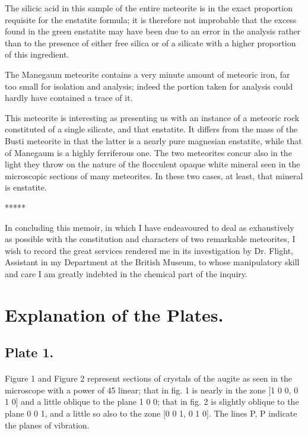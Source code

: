 \documentclass[a4paper, 12pt, oneside]{article}
\begin{document}
The silicic acid in this sample of the entire meteorite is in the exact proportion requisite for the enstatite formula; it is therefore not improbable that the excess found in the green enstatite may have been due to an error in the analysis rather than to the presence of either free silica or of a silicate with a higher proportion of this ingredient.

The Manegaum meteorite contains a very minute amount of meteoric iron, far too small for isolation and analysis; indeed the portion taken for analysis could hardly have contained a trace of it.

This meteorite is interesting as presenting us with an instance of a meteoric rock constituted of a single silicate, and that enstatite. It differs from the mass of the Busti meteorite in that the latter is a nearly pure magnesian enstatite, while that of Manegaum is a highly ferriferous one. The two meteorites concur also in the light they throw on the nature of the flocculent opaque white mineral seen in the microscopic sections of many meteorites. In these two cases, at least, that mineral is enstatite.

\centerline{*\hspace{15mm}*\hspace{15mm}*\hspace{15mm}*\hspace{15mm}*}
\bigskip

In concluding this memoir, in which I have endeavoured to deal as exhaustively as possible with the constitution and characters of two remarkable meteorites, I wish to record the great services rendered me in its investigation by Dr. Flight, Assistant in my Department at the British Museum, to whose manipulatory skill and care I am greatly indebted in the chemical part of the inquiry.
\clearpage
\section{Explanation of the Plates.}
\subsection{Plate 1.}
\paragraph{}
Figure 1 and Figure 2 represent sections of crystals of the augite as seen in the microscope with a power of 45 linear; that in fig. 1 is nearly in the zone [1 0 0, 0 1 0] and a little oblique to the plane 1 0 0; that in fig. 2 is slightly oblique to the plane 0 0 1, and a little so also to the zone [0 0 1, 0 1 0]. The lines P, P indicate the planes of vibration.
\end{document}
